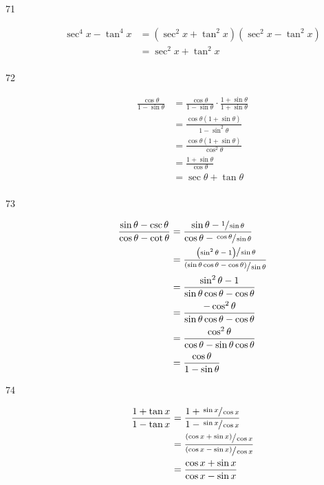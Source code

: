 \documentclass{exam}
\begin{document}
\begin{description}
      \item[71] 
        \begin{align*}
          \sec^4 x - \tan^4 x & = (\sec^2 x + \tan^2 x)(\sec^2 x - \tan^2 x) \\
                              & = \sec^2 x + \tan^2 x \\
        \end{align*}

      \item[72] 
        \begin{align*}
          \frac{\cos \theta}{1 - \sin \theta} & = \frac{\cos \theta}{1 - \sin \theta} \cdot \frac{1 + \sin \theta}{1 + \sin \theta} \\
                                              & = \frac{\cos \theta (1 + \sin \theta)}{1 - \sin^2 \theta} \\
                                              & = \frac{\cos \theta (1 + \sin \theta)}{\cos^2 \theta} \\
                                              & = \frac{1 + \sin \theta}{\cos \theta} \\
                                              & = \sec \theta + \tan \theta \\
        \end{align*}

      \item[73] 
        \begin{align*}
          \frac{\sin \theta - \csc \theta}{\cos \theta - \cot \theta} & = \frac{\sin \theta - \sfrac{1}{\sin \theta}}{\cos \theta - \sfrac{\cos \theta}{\sin \theta}} \\
            & = \frac{\sfrac{ \left( \sin^2 \theta - 1 \right) }{\sin \theta}}{\sfrac{ (\sin \theta \cos \theta - \cos \theta) }{\sin \theta}} \\
            & = \frac{\sin^2 \theta - 1}{\sin \theta \cos \theta - \cos \theta} \\
            & = \frac{- \cos^2 \theta}{\sin \theta \cos \theta - \cos \theta} \\
            & = \frac{\cos^2 \theta}{\cos \theta - \sin \theta \cos \theta} \\
            & = \frac{\cos \theta}{1 - \sin \theta} \\
        \end{align*}

      \item[74] 
        \begin{align*}
          \frac{1 + \tan x}{1 - \tan x} & = \frac{1 + \sfrac{\sin x}{\cos x}}{1 - \sfrac{\sin x}{\cos x}} \\
                                        & = \frac{\sfrac{ (\cos x + \sin x) }{\cos x}}{\sfrac{ (\cos x - \sin x) }{\cos x}} \\
                                        & = \frac{\cos x + \sin x}{\cos x - \sin x} \\
        \end{align*}


\end{description}
\end{document}
